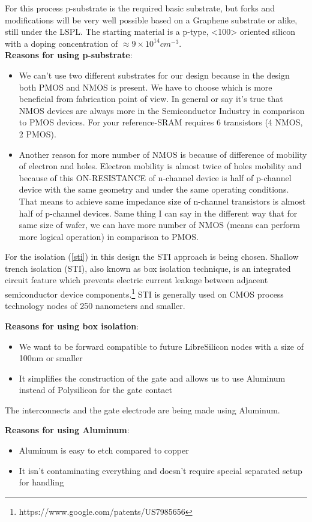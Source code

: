 For this process p-substrate is the required basic substrate, but forks and modifications will be very well possible based on a Graphene substrate or alike, still under the LSPL.
The starting material is a p-type, <100> oriented silicon with a doping concentration of $\approx 9\times10^{14}cm^{-3}$.\\

\textbf{Reasons for using p-substrate}:\begin{itemize}
\item We can't use two different substrates for our design because in the design both PMOS and NMOS is present.
We have to choose which is more beneficial from fabrication point of view.
In general or say it's true that NMOS devices are always more in the Semiconductor Industry in comparison to PMOS devices.
For your reference-SRAM requires 6 transistors (4 NMOS, 2 PMOS).
\item Another reason for more number of NMOS is because of difference of mobility of electron and holes.
Electron mobility is almost twice of holes mobility and because of this ON-RESISTANCE of n-channel device is half of p-channel device with the same geometry and under the same operating conditions.
That means to achieve same impedance size of n-channel transistors is almost half of p-channel devices.
Same thing I can say in the different way that for same size of wafer, we can have more number of NMOS (means can perform more logical operation) in comparison to PMOS.
\end{itemize}

For the isolation (\autoref{sti})  in this design the STI approach is being chosen.
Shallow trench isolation (STI), also known as box isolation technique, is an integrated circuit feature which prevents electric current leakage between adjacent semiconductor device components.\footnote{https://www.google.com/patents/US7985656}
STI is generally used on CMOS process technology nodes of 250 nanometers and smaller.

\textbf{Reasons for using box isolation}:\begin{itemize}
\item We want to be forward compatible to future LibreSilicon nodes with a size of 100nm or smaller
\item It simplifies the construction of the gate and allows us to use Aluminum instead of Polysilicon for the gate contact
\end{itemize}

The interconnects and the gate electrode are being made using Aluminum.

\textbf{Reasons for using Aluminum}:\begin{itemize}
\item Aluminum is easy to etch compared to copper
\item It isn't contaminating everything and doesn't require special separated setup for handling
\end{itemize}

